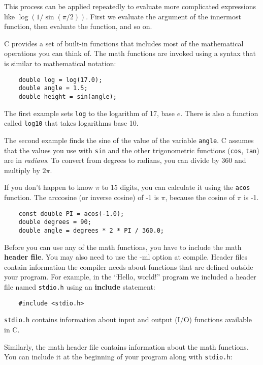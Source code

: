 This process can be applied repeatedly to evaluate more complicated
expressions like $\log(1/\sin(\pi/2))$.  First we evaluate the
argument of the innermost function, then evaluate the function,
and so on.

C provides a set of built-in functions that includes most
of the mathematical operations you can think of.
The math functions are invoked using a syntax that is similar to
mathematical notation:

\begin{verbatim}
    double log = log(17.0);
    double angle = 1.5;
    double height = sin(angle);
\end{verbatim}
%
The first example sets {\tt log} to the logarithm of 17, base
$e$.  There is also a function called {\tt log10} that takes
logarithms base 10.

The second example finds the sine of the value of the variable
{\tt angle}.  C assumes that the
values you use with {\tt sin} and the other trigonometric functions
({\tt cos}, {\tt tan}) are in {\em radians}.  To
convert from degrees to radians, you can divide by 360
and multiply by $2 \pi$.  

If you don't happen to know $\pi$ to 15 digits, you can
calculate it using the {\tt acos} function.  The arccosine
(or inverse cosine) of -1 is $\pi$, because the cosine of
$\pi$ is -1.

\begin{verbatim}
    const double PI = acos(-1.0);
    double degrees = 90;
    double angle = degrees * 2 * PI / 360.0;
\end{verbatim}
%
Before you can use any of the math functions, you have to
include the math {\bf header file}.  You may also need to use the -ml option at compile.
Header files contain information the compiler needs about functions that are defined
outside your program. For example, in the ``Hello, world!''
program we included a header file named {\tt stdio.h} using
an {\bf include} statement:

\begin{verbatim}
    #include <stdio.h>
\end{verbatim}
%
{\tt stdio.h} contains information about input and output
(I/O) functions available in C.


Similarly, the math header file contains information
about the math functions.  You can include it at the beginning
of your program along with {\tt stdio.h}:

